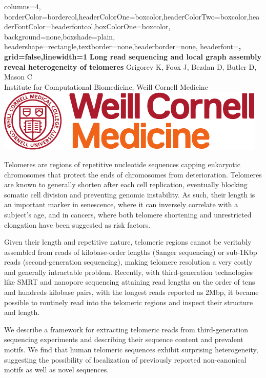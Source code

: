 \documentclass[paperwidth=42in,paperheight=47.75in,portrait]{baposter}
\begin{document}
\begin{poster}{
    columns=4,
    borderColor=bordercol,headerColorOne=boxcolor,headerColorTwo=boxcolor,headerFontColor=headerfontcol,boxColorOne=boxcolor,
    background=none,boxshade=plain,
    headershape=rectangle,textborder=none,headerborder=none,
    headerfont=\Large\sf\bf,
    grid=false,linewidth=1
}
{}{\sf\bf Long read sequencing and local graph assembly \\ reveal heterogeneity of telomeres} {
    \vspace{.4em} Grigorev K, Foox J, Bezdan D, Butler D, Mason C \\
    {\small Institute for Computational Biomedicine, Weill Cornell Medicine}
}
{\includegraphics[scale=1.7]{logo.pdf}}


{
    Telomeres are regions of repetitive nucleotide sequences capping eukaryotic chromosomes that protect the ends of chromosomes from deterioration.
    Telomeres are known to generally shorten after each cell replication, eventually blocking somatic cell division and preventing genomic instability.
    As such, their length is an important marker in senescence, where it can inversely correlate with a subject’s age, and in cancers, where both
    telomere shortening and unrestricted elongation have been suggested as risk factors.

    Given their length and repetitive nature, telomeric regions cannot be veritably assembled from reads of kilobase-order lengths (Sanger sequencing)
    or sub-1Kbp reads (second-generation sequencing), making telomere resolution a very costly and generally intractable problem.
    Recently, with third-generation technologies like SMRT and nanopore sequencing attaining read lengths on the order of tens and hundreds kilobase
    pairs, with the longest reads reported as 2Mbp, it became possible to routinely read into the telomeric regions and inspect their structure
    and length.

    We describe a framework for extracting telomeric reads from third-generation sequencing experiments and describing their sequence content and
    prevalent motifs. We find that human telomeric sequences exhibit surprising heterogeneity, suggesting the possibility of localization of previously
    reported non-canonical motifs as well as novel sequences.

}
\end{poster}
\end{document}
